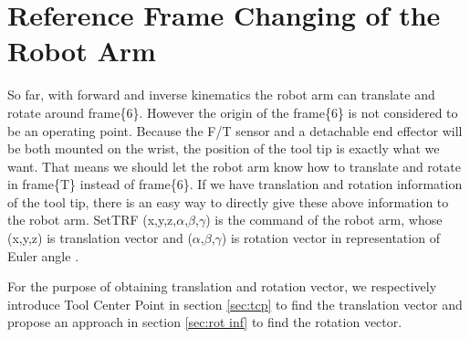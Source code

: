 \section{Reference Frame Changing of the Robot Arm}
\label{sec:ref_robot}
So far, with forward and inverse kinematics the robot arm can translate and rotate around frame\{6\}. However the origin of the frame\{6\} is not considered to be an operating point. Because the F/T sensor and a detachable end effector will be both mounted on the wrist, the position of the tool tip is exactly what we want. That means we should let the robot arm know how to translate and rotate in frame\{T\} instead of frame\{6\}. If we have translation and rotation information of the tool tip, there is an easy way to directly give these above information to the robot arm. SetTRF (x,y,z,$\alpha$,$\beta$,$\gamma$) is the command of the robot arm, whose (x,y,z) is translation vector and ($\alpha$,$\beta$,$\gamma$) is rotation vector in representation of Euler angle .

For the purpose of obtaining translation and rotation vector, we respectively introduce Tool Center Point in section \ref{sec:tcp} to find the translation vector and propose an approach in section \ref{sec:rot inf} to find the rotation vector.							
